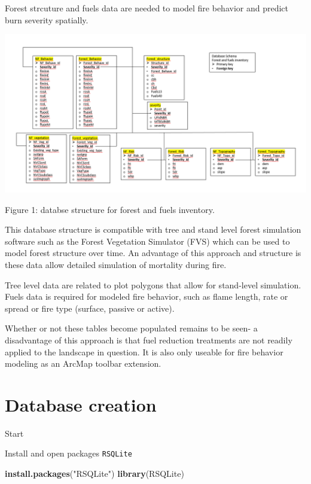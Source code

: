 \documentclass[]{book}
\newenvironment{Shaded}{\begin{snugshade}}{\end{snugshade}}
\newcommand{\KeywordTok}[1]{\textcolor[rgb]{0.13,0.29,0.53}{\textbf{#1}}}
\newcommand{\NormalTok}[1]{#1}
\newcommand{\StringTok}[1]{\textcolor[rgb]{0.31,0.60,0.02}{#1}}
\begin{document}
Forest strcuture and fuels data are needed to model fire behavior and predict burn severity spatially.

\begin{center}\includegraphics{db_structure} \end{center}

Figure 1: databse structure for forest and fuels inventory.

This database structure is compatible with tree and stand level forest simulation software such as the Forest Vegetation Simulator (FVS) which can be used to model forest structure over time. An advantage of this approach and structure is these data allow detailed simulation of mortality during fire.

Tree level data are related to plot polygons that allow for stand-level simulation. Fuels data is required for modeled fire behavior, such as flame length, rate or spread or fire type (surface, passive or active).

Whether or not these tables become populated remains to be seen- a disadvantage of this approach is that fuel reduction treatments are not readily applied to the landscape in question. It is also only useable for fire behavior modeling as an ArcMap toolbar extension.

\hypertarget{creation}{%
\chapter{Database creation}\label{creation}}

Start

Install and open packages \texttt{RSQLite}

\begin{Shaded}
\begin{Highlighting}[]
\KeywordTok{install.packages}\NormalTok{(}\StringTok{"RSQLite"}\NormalTok{)}
\KeywordTok{library}\NormalTok{(RSQLite)}
\end{Highlighting}
\end{Shaded}
\end{document}
